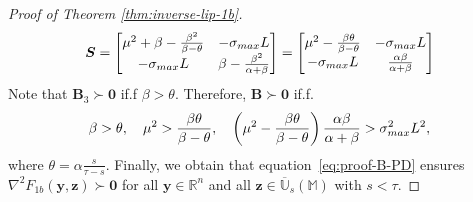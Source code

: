 \documentclass[10pt,a4paper]{amsart}
\def\eqref#1{equation~\ref{#1}}
\def\mB{{\bm{B}}}
\def\mS{{\bm{S}}}
\def\sM{{\mathbb{M}}}
\def\sR{{\mathbb{R}}}
\def\sU{{\mathbb{U}}}
\def\vy{{\bm{y}}}
\def\vz{{\bm{z}}}
\def\vzero{{\bm{0}}}
\begin{document}
\begin{proof}[Proof of Theorem \ref{thm:inverse-lip-1b}]
\[ \mS =  \begin{bmatrix}
\mu^2 + \beta - \frac{\beta^2}{\beta-\theta} & - \sigma_{\textup{max}} L \\
- \sigma_{\textup{max}} L & \beta - \frac{\beta^2}{\alpha+\beta}
\end{bmatrix} = 
\begin{bmatrix}
\mu^2 - \frac{\beta \theta}{\beta-\theta} & - \sigma_{\textup{max}} L \\
- \sigma_{\textup{max}} L & \frac{\alpha\beta}{\alpha+\beta}
\end{bmatrix}
\]
Note that $\mB_3 \succ \vzero$ if.f $\beta > \theta$. Therefore, $\mB \succ \vzero$ if.f.
\begin{equation}
\label{eq:proof-B-PD}
\beta > \theta, \quad \mu^2 > \frac{\beta \theta}{\beta-\theta}, \quad \left(\mu^2 - \frac{\beta \theta}{\beta-\theta}\right)\frac{\alpha\beta}{\alpha+\beta} > \sigma^2_{\textup{max}} L^2,
\end{equation}
where $\theta = \alpha \frac{s}{\tau-s}$. Finally, we obtain that \eqref{eq:proof-B-PD} ensures $\nabla^2F_{1b}(\vy,\vz)\succ \vzero$ for all $\vy \in \sR^n$ and all $\vz \in \overline{\sU}_s(\sM)$ with $s < \tau$.


\end{proof}
\end{document}
